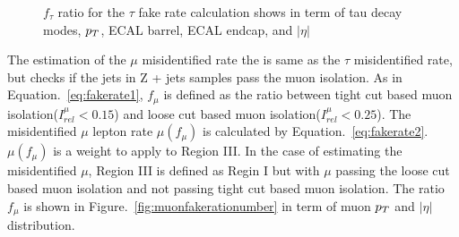 \begin{figure}[htbp]
     \caption{$f_{\tau}$ ratio for the $\tau$ fake rate calculation shows in term of tau decay modes, $p_{T}$, ECAL barrel, ECAL endcap, and $|\eta|$}
     \label{fig:fakerationumber}
\end{figure}

The estimation of the $\mu$ misidentified rate the is same as the $\tau$ misidentified rate, but checks if the jets in Z + jets samples pass the muon isolation. As in Equation.~\ref{eq:fakerate1}, $f_{\mu}$ is defined as the ratio between tight cut based muon isolation($I^{\mu}_{rel}<0.15$) and loose cut based muon isolation($I^{\mu}_{rel}<0.25$). The misidentified $\mu$ lepton rate $\mu(f_{\mu})$ is calculated by Equation.~\ref{eq:fakerate2}. $\mu(f_{\mu})$ is a weight to apply to Region III. In the case of estimating the misidentified $\mu$, Region III is defined as Regin I but with $\mu$ passing the loose cut based muon isolation and not passing tight cut based muon isolation. The ratio $f_{\mu}$ is shown in Figure.~\ref{fig:muonfakerationumber} in term of muon $p_{T}$ and $|\eta|$ distribution. 

